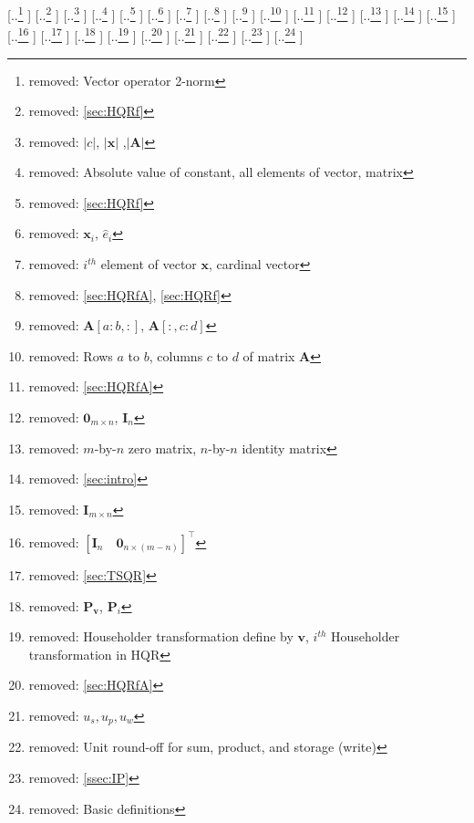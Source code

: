\documentclass[review,onefignum,onetabnum]{siamart190516}
\newcommand{\tth}{\theta}
\newcommand{\bb}[1]{\mathbf{#1}}
\providecommand{\DIFdel}[1]{{\protect\color{red} [..\footnote{removed: #1} ]}} %
\providecommand{\DIFdelFL}[1]{\DIFdel{#1}} %
\begin{document}
\DIFdelFL{Vector operator 2-norm }%
\DIFdelFL{\ref{sec:HQRf}}%
\DIFdelFL{$|c|$, $|\bb{x}|$ ,$|\bb{A}|$ }%
\DIFdelFL{Absolute value of constant, all elements of vector, matrix }%
\DIFdelFL{\ref{sec:HQRf} }%
\DIFdelFL{$\bb{x}_i$, $\hat{e}_i$  }%
\DIFdelFL{$i^{th}$ element of vector $\bb{x}$, cardinal vector }%
\DIFdelFL{\ref{sec:HQRfA}, \ref{sec:HQRf}}%
		\DIFdelFL{$\bb{A}[a:b,:]$, $\bb{A}[:,c:d]$ }%
\DIFdelFL{Rows $a$ to $b$, columns $c$ to $d$ of matrix $\bb{A}$}%
\DIFdelFL{\ref{sec:HQRfA}}%
\DIFdelFL{$\bb{0}_{m\times n}$, $\bb{I}_{n}$ }%
\DIFdelFL{$m$-by-$n$ zero matrix, $n$-by-$n$ identity  matrix }%
\DIFdelFL{\ref{sec:intro}}%
		\DIFdelFL{$\bb{I}_{m\times n}$ }%
\DIFdelFL{$[\bb{I}_{n} \quad \bb{0}_{n \times (m-n)}]^{\top}$ }%
\DIFdelFL{\ref{sec:TSQR}}%
\DIFdelFL{$\bb{P}_{\bb{v}}$, $\bb{P}_i$ }%
\DIFdelFL{Householder transformation define by $\bb{v}$, $i^{th}$ Householder transformation in HQR}%
\DIFdelFL{\ref{sec:HQRfA}}%
\DIFdelFL{$u_s, u_p, u_w$ }%
\DIFdelFL{Unit round-off for sum, product, and storage (write) }%
\DIFdelFL{\ref{ssec:IP}}%
{%
\DIFdelFL{Basic definitions}}
\end{document}

